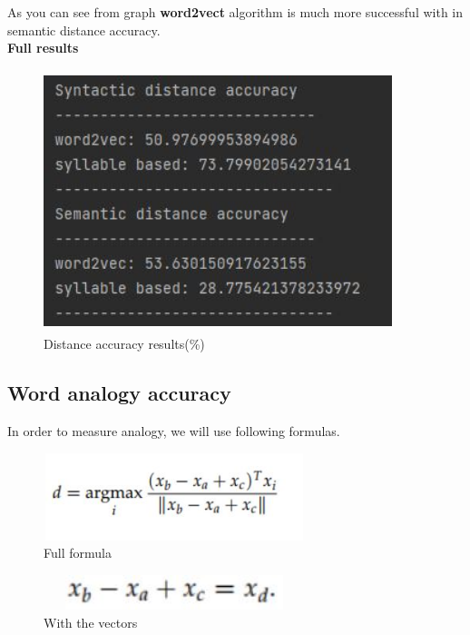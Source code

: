 \documentclass{article}
\begin{document}
As you can see from graph \textbf{word2vect} algorithm is much more successful with in semantic distance accuracy. \\
\newline
\textbf{Full results}
\begin{figure}[H]
    \centering
	\includegraphics[width=4in, height=3in]{24.JPG}
	\caption[Optional caption]{Distance accuracy results(\%)}
	\label{}
\end{figure}
\cleardoublepage
\subsection{Word analogy accuracy}
In order to measure analogy, we will use following formulas.
\begin{figure}[H]
    \centering
	\includegraphics[width=3in, height=1in]{21.JPG}
	\caption[Optional caption]{Full formula}
	\label{}
\end{figure}
\begin{figure}[H]
    \centering
	\includegraphics[width=3in, height=0.4in]{22.JPG}
	\caption[Optional caption]{With the vectors}
	\label{}
\end{figure}  
\end{document}
